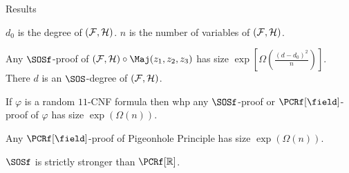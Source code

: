 \begin{frame}{Results}

    $d_0$ is the degree of $(\mathcal{F}, \mathcal{H})$. $n$ is the number of variables of $(\mathcal{F}, \mathcal{H})$.
    
    \begin{theorem}
        Any $\SOSf$-proof of $(\Fs, \Hs) \circ \Maj(z_1, z_2, z_3)$ has size
        $\exp\left[\Omega\left(\frac{(d - d_0)^2}{n}\right)\right]$. There $d$ is an
        $\SOS$-degree of $(\mathcal{F}, \mathcal{H})$.
    \end{theorem}

    \pause

    \begin{theorem}
        If $\varphi$ is a random $11$-CNF formula then whp any $\SOSf$-proof or $\PCRf[\field]$-proof of
        $\varphi$ has size $\exp(\Omega(n))$.
    \end{theorem}

    \pause
    \begin{theorem}
        Any $\PCRf[\field]$-proof of Pigeonhole Principle has size $\exp(\Omega(n))$.
    \end{theorem}

    $\SOSf$ is strictly stronger than $\PCRf[\mathbb{R}]$.

\end{frame}